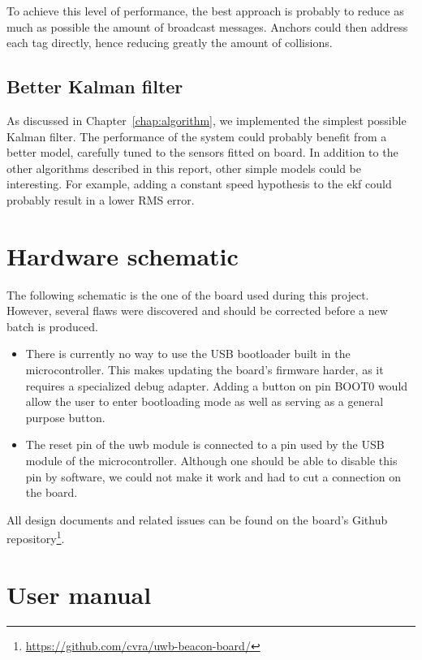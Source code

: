 \documentclass[a4paper, 12pt]{scrreprt}
\begin{document}
To achieve this level of performance, the best approach is probably to reduce as much as possible the amount of broadcast messages.
Anchors could then address each tag directly, hence reducing greatly the amount of collisions.


\section{Better Kalman filter}

As discussed in Chapter~\ref{chap:algorithm}, we implemented the simplest possible Kalman filter.
The performance of the system could probably benefit from a better model, carefully tuned to the sensors fitted on board.
In addition to the other algorithms described in this report, other simple models could be interesting.
For example, adding a constant speed hypothesis to the \gls{ekf} could probably result in a lower RMS error.


\appendix
\chapter{Hardware schematic}

The following schematic is the one of the board used during this project.
However, several flaws were discovered and should be corrected before a new batch is produced.

\begin{itemize}
    \item There is currently no way to use the USB bootloader built in the microcontroller.
        This makes updating the board's firmware harder, as it requires a specialized debug adapter.
        Adding a button on pin BOOT0 would allow the user to enter bootloading mode as well as serving as a general purpose button.
    \item The reset pin of the \gls{uwb} module is connected to a pin used by the USB module of the microcontroller.
        Although one should be able to disable this pin by software, we could not make it work and had to cut a connection on the board.
\end{itemize}

All design documents and related issues can be found on the board's Github repository\footnote{\url{https://github.com/cvra/uwb-beacon-board/}}.




\chapter{User manual}



\clearpage
\nocite{*} %


\end{document}
